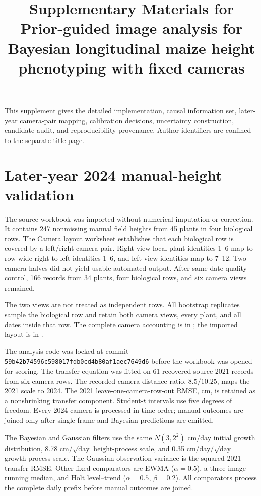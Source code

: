 \documentclass[review,12pt,authoryear]{elsarticle}
\begin{document}
\begin{frontmatter}
\title{Supplementary Materials for\\Prior-guided image analysis for Bayesian longitudinal maize height phenotyping with fixed cameras}
\end{frontmatter}
\linenumbers
\noindent This supplement gives the detailed implementation, causal information set, later-year camera-pair mapping, calibration decisions, uncertainty construction, candidate audit, and reproducibility provenance. Author identifiers are confined to the separate title page.


\section{Later-year 2024 manual-height validation}
\label{sec:s-2024-validation}

The source workbook was imported without numerical imputation or correction. It contains 247 nonmissing manual field heights from 45 plants in four biological rows. The Camera layout worksheet establishes that each biological row is covered by a left/right camera pair. Right-view local plant identities 1--6 map to row-wide right-to-left identities 1--6, and left-view identities map to 7--12. Two camera halves did not yield usable automated output. After same-date quality control, 166 records from 34 plants, four biological rows, and six camera views remained.

The two views are not treated as independent rows. All bootstrap replicates sample the biological row and retain both camera views, every plant, and all dates inside that row. The complete camera accounting is in ; the imported layout is in .

The analysis code was locked at commit \texttt{59b42b74596c598017fdb0cd4b80af1aec7649d6} before the workbook was opened for scoring. The transfer equation was fitted on 61 recovered-source 2021 records from six camera rows. The recorded camera-distance ratio, $8.5/10.25$, maps the 2021 scale to 2024. The 2021 leave-one-camera-row-out RMSE, \TransferDevCVRMSE{} cm, is retained as a nonshrinking transfer component. Student-$t$ intervals use five degrees of freedom. Every 2024 camera is processed in time order; manual outcomes are joined only after single-frame and Bayesian predictions are emitted.

The Bayesian and Gaussian filters use the same $N(3,2^2)$ cm/day initial growth distribution, 8.78 cm/$\sqrt{\mathrm{day}}$ height-process scale, and 0.35 cm/day/$\sqrt{\mathrm{day}}$ growth-process scale. The Gaussian observation variance is the squared 2021 transfer RMSE. Other fixed comparators are EWMA ($\alpha=0.5$), a three-image running median, and Holt level--trend ($\alpha=0.5$, $\beta=0.2$). All comparators process the complete daily prefix before manual outcomes are joined.
\end{document}
